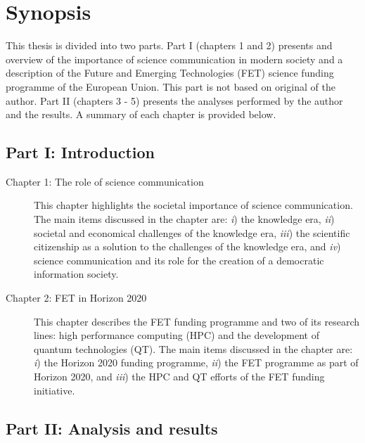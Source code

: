 \chapter*{Synopsis}
This thesis is divided into two parts. Part I (chapters 1 and 2) presents and overview of the importance of science communication in modern society and a description of the Future and Emerging Technologies (FET) science funding programme of the European Union. This part is not based on original of the author. Part II (chapters 3 - 5) presents the analyses performed by the author and the results. A summary of each chapter is provided below.

\section*{Part I: Introduction}

\begin{description}
 \item [Chapter 1: The role of science communication] This chapter highlights the societal importance of science communication. The main items discussed in the chapter are: \emph{i}) the knowledge era, \emph{ii}) societal and economical challenges of the knowledge era, \emph{iii}) the scientific citizenship as a solution to the challenges of the knowledge era, and \emph{iv}) science communication and its role for the creation of a democratic information society.

 \item [Chapter 2: FET in Horizon 2020] This chapter describes the FET funding programme and two of its research lines: high performance computing (HPC) and the development of quantum technologies (QT). The main items discussed in the chapter are: \emph{i}) the Horizon 2020 funding programme, \emph{ii}) the FET programme as part of Horizon 2020, and \emph{iii}) the HPC and QT efforts of the FET funding initiative.
\end{description}

\section*{Part II: Analysis and results}

